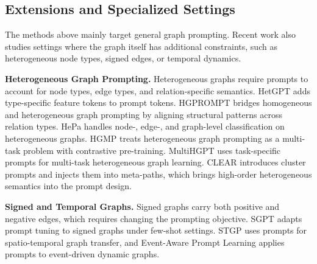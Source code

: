 \subsection{Extensions and Specialized Settings}\label{subsec:pextensions}

The methods above mainly target general graph prompting. Recent work also studies settings where the graph itself has additional constraints, such as heterogeneous node types, signed edges, or temporal dynamics.

\textbf{Heterogeneous Graph Prompting.} Heterogeneous graphs require prompts to account for node types, edge types, and relation-specific semantics. HetGPT \cite{ma2023hetgpt} adds type-specific feature tokens to prompt tokens. HGPROMPT \cite{yu_hgprompt_2024} bridges homogeneous and heterogeneous graph prompting by aligning structural patterns across relation types. HePa \cite{jia_hepa_2025} handles node-, edge-, and graph-level classification on heterogeneous graphs. HGMP \cite{jiao_hgmp_2025} treats heterogeneous graph prompting as a multi-task problem with contrastive pre-training. MultiHGPT \cite{wang_multihgpt_2025} uses task-specific prompts for multi-task heterogeneous graph learning. CLEAR \cite{wang2025clear} introduces cluster prompts and injects them into meta-paths, which brings high-order heterogeneous semantics into the prompt design.

\textbf{Signed and Temporal Graphs.} Signed graphs carry both positive and negative edges, which requires changing the prompting objective. SGPT \cite{zhai2024sgpt} adapts prompt tuning to signed graphs under few-shot settings. STGP \cite{hu_prompt-based_2024} uses prompts for spatio-temporal graph transfer, and Event-Aware Prompt Learning \cite{yu_event-aware_2025} applies prompts to event-driven dynamic graphs.
